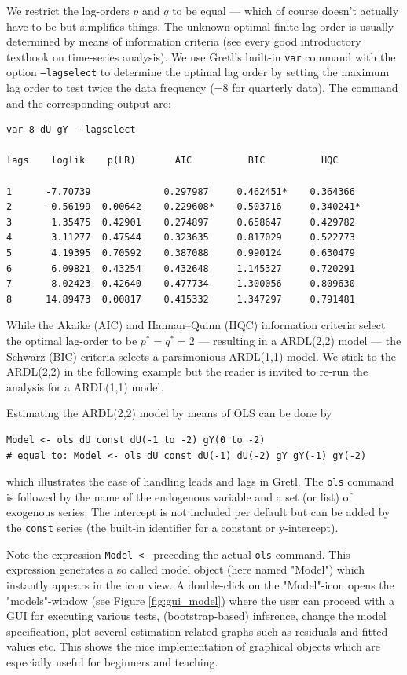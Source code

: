 \documentclass[11pt]{article}
\begin{document}
We restrict the lag-orders $ p $ and $ q $ to be equal --- which of course doesn't actually have to be but simplifies things. The unknown optimal finite lag-order is usually determined by means of information criteria (see every good introductory textbook on time-series analysis). We use Gretl's built-in \texttt{var} command with the option \texttt{---lagselect} to determine the optimal lag order by setting the maximum lag order to test twice the data frequency (=8 for quarterly data). The command and the corresponding output are:
\begin{Verbatim}[baselinestretch=0.75, fontsize=\small]
var 8 dU gY --lagselect

lags    loglik    p(LR)       AIC          BIC          HQC

1      -7.70739             0.297987     0.462451*    0.364366 
2      -0.56199  0.00642    0.229608*    0.503716     0.340241*
3       1.35475  0.42901    0.274897     0.658647     0.429782 
4       3.11277  0.47544    0.323635     0.817029     0.522773 
5       4.19395  0.70592    0.387088     0.990124     0.630479 
6       6.09821  0.43254    0.432648     1.145327     0.720291 
7       8.02423  0.42640    0.477734     1.300056     0.809630 
8      14.89473  0.00817    0.415332     1.347297     0.791481 
\end{Verbatim}
While the Akaike (AIC) and Hannan–Quinn (HQC) information criteria select the optimal lag-order to be $ p^\ast = q^\ast = 2 $ --- resulting in a ARDL(2,2) model --- the Schwarz (BIC) criteria selects a parsimonious ARDL(1,1) model. We stick to the ARDL(2,2) in the following example but the reader is invited to re-run the analysis for a ARDL(1,1) model.

Estimating the ARDL(2,2) model by means of OLS can be done by
\begin{Verbatim}[baselinestretch=0.75, fontsize=\small]
Model <- ols dU const dU(-1 to -2) gY(0 to -2)
# equal to: Model <- ols dU const dU(-1) dU(-2) gY gY(-1) gY(-2)
\end{Verbatim}
which illustrates the ease of handling leads and lags in Gretl. The \texttt{ols} command is followed by the name of the endogenous variable and a set (or list) of exogenous series. The intercept is not included per default but can be added by the \texttt{const} series (the built-in identifier for a
constant or y-intercept).

Note the expression \texttt{Model <--} preceding the actual \texttt{ols} command. This expression generates a so called model object (here named "Model") which instantly appears in the icon view. A double-click on the "Model"-icon opens the "models"-window (see Figure \ref{fig:gui_model}) where the user can proceed with a GUI for executing various tests, (bootstrap-based) inference, change the model specification, plot several estimation-related graphs such as residuals and fitted values etc. This shows the nice implementation of graphical objects which are especially useful for beginners and teaching.
\end{document}

